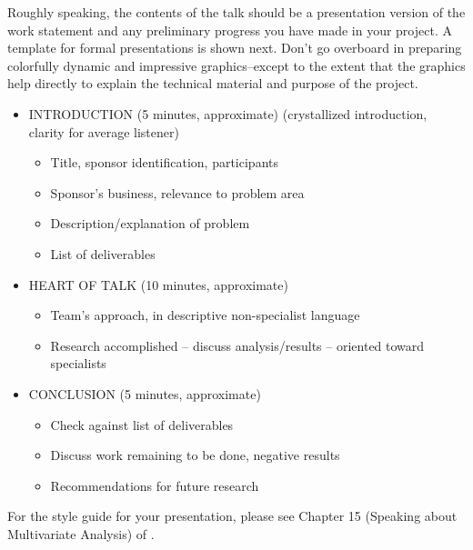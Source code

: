 \documentclass[12pt]{article}
\begin{document}
Roughly speaking, the contents of the talk should be a presentation
version of the work statement and any preliminary 
progress you have made in your project. A template for formal
presentations is shown next. Don't go overboard
in preparing colorfully dynamic and impressive graphics--except to the
extent that the graphics help directly to explain the technical
material and purpose of the project. 
\begin{itemize}
\item INTRODUCTION (5 minutes, approximate) (crystallized
  introduction, clarity for average listener)
\begin{itemize}
\item Title, sponsor identification, participants
\item Sponsor's business, relevance to problem area
\item Description/explanation of problem
\item List of deliverables
\end{itemize}
\item HEART OF TALK (10 minutes, approximate)
\begin{itemize}
\item Team's approach, in descriptive non-specialist language
\item Research accomplished -- discuss analysis/results -- oriented toward
specialists
\end{itemize}
\item CONCLUSION (5 minutes, approximate)
\begin{itemize}
\item Check against list of deliverables
\item Discuss work remaining to be done, negative results
\item Recommendations for future research
\end{itemize}
\end{itemize}

For the style guide for your presentation, please see 
Chapter 15 (Speaking about Multivariate Analysis) of \cite{WMA2005}.


\nocite{*}

\end{document}
